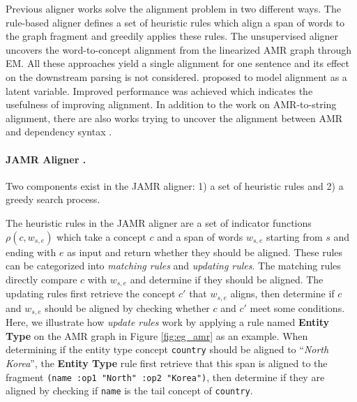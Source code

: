 \documentclass[11pt,a4paper]{article}
\begin{document}
Previous aligner works solve the alignment problem
in two different ways.
The rule-based aligner \cite{flanigan-EtAl:2014:P14-1}
defines a set of heuristic rules which align a span of
words to the graph fragment and greedily applies
these rules.
The unsupervised aligner
\cite{pourdamghani-EtAl:2014:EMNLP2014,wang-xue:2017:EMNLP2017}
uncovers the word-to-concept alignment from
the linearized AMR graph through EM.
All these approaches yield a single alignment for one sentence
and its effect on the downstream parsing is not considered.
\citet{P18-1037} proposed to
model alignment as a latent variable.
Improved performance was achieved
which indicates the usefulness of improving alignment.
In addition to the work on AMR-to-string alignment,
there are also works trying to uncover the 
alignment between AMR  and dependency syntax \citep{szubert-lopez-schneider:2018:N18-1}.

\paragraph{JAMR Aligner \cite{flanigan-EtAl:2014:P14-1}.}
Two components exist in the JAMR aligner:
1) a set of heuristic rules and 2) a greedy search process.

The heuristic rules in the JAMR aligner
are a set of indicator functions $\rho(c, w_{s, e})$
which take a concept $c$ and a span of words $w_{s, e}$ starting from $s$ and ending with $e$
as input and return whether
they should be aligned.
These rules  can be categorized into {\it matching rules} and {\it updating rules}.
The matching rules directly compare $c$ with $w_{s, e}$ and determine if they should be aligned.
The updating rules first retrieve the concept $c'$ that $w_{s, e}$ aligns,
then determine if $c$ and $w_{s, e}$ should be aligned by checking whether
$c$ and $c'$ meet some conditions.
Here, we illustrate how \textit{update rules} work by applying a rule named \textbf{Entity Type}
on the AMR graph in Figure \ref{fig:eg_amr}
as an example.
When determining if the entity type concept \texttt{country} should be aligned to ``\textit{North Korea}'',
the \textbf{Entity Type} rule first retrieve that this span is aligned to the fragment \texttt{(name :op1 "North" :op2 "Korea")},
then determine if they are aligned by checking if \texttt{name} is the tail concept of \texttt{country}.
\end{document}
